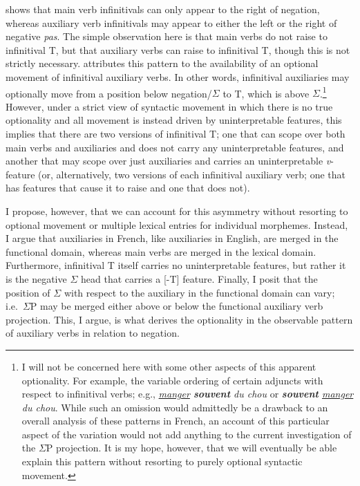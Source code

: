 \Last shows that main verb infinitivals can only appear to the right of negation, whereas auxiliary verb infinitivals may appear to either the left or the right of negative {\it pas}. The simple observation here is that main verbs do not raise to infinitival T, but that auxiliary verbs can raise to infinitival T, though this is not strictly necessary. \citet{pollock1989} attributes this pattern to the availability of an optional movement of infinitival auxiliary verbs. In other words, infinitival auxiliaries may optionally move from a position below negation/$\Sigma$ to T, which is above $\Sigma$.\footnote{I will not be concerned here with some other aspects of this apparent optionality. For example, the variable ordering of certain adjuncts with respect to infinitival verbs; e.g., {\it \underline{manger} \textbf{souvent} du chou} or {\it \textbf{souvent} \underline{manger} du chou}. While such an omission would admittedly be a drawback to an overall analysis of these patterns in French, an account of this particular aspect of the variation would not add anything to the current investigation of the $\Sigma$P projection. It is my hope, however, that we will eventually be able explain this pattern without resorting to purely optional syntactic movement.} However, under a strict view of syntactic movement in which there is no true optionality and all movement is instead driven by uninterpretable features, this implies that there are two versions of infinitival T; one that can scope over both main verbs and auxiliaries and does not carry any uninterpretable features, and another that may scope over just auxiliaries and carries an uninterpretable {\it v}-feature (or, alternatively, two versions of each infinitival auxiliary verb; one that has features that cause it to raise and one that does not).

I propose, however, that we can account for this asymmetry without resorting to optional movement or multiple lexical entries for individual morphemes. Instead, I argue that auxiliaries in French, like auxiliaries in English, are merged in the functional domain, whereas main verbs are merged in the lexical domain. Furthermore, infinitival T itself carries no uninterpretable features, but rather it is the negative $\Sigma$ head that carries a [-T] feature. Finally, I posit that the position of $\Sigma$ with respect to the auxiliary in the functional domain can vary; i.e.\ $\Sigma$P may be merged either above or below the functional auxiliary verb projection. This, I argue, is what derives the optionality in the observable pattern of auxiliary verbs in relation to negation.

